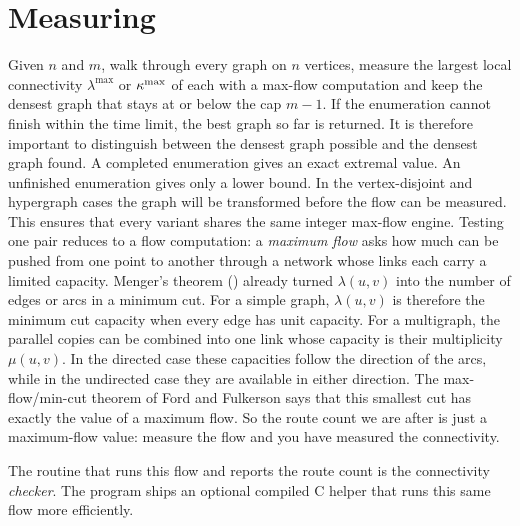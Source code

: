 \section{Measuring}
Given $n$ and $m$, walk through every graph on $n$ vertices, measure the largest
local connectivity $\lambda^{\max}$ or $\kappa^{\max}$ of each with a max-flow computation and
keep the densest graph that stays at or below the cap $m - 1$.
If the enumeration cannot finish within the time limit, the best graph so far is returned.
It is therefore important to distinguish between the densest graph possible and the densest graph found.
A completed enumeration gives an exact extremal value. An unfinished enumeration gives only a lower bound.
In the vertex-disjoint and hypergraph cases the graph will be transformed before the flow can be measured.
This ensures that every variant shares the same integer max-flow engine.
Testing one pair reduces to a flow computation:
a \emph{maximum flow} asks how much can be pushed from one point to another through a network whose links each carry a limited capacity.
Menger's theorem () already turned $\lambda(u,v)$ into the number of edges or arcs in a minimum cut.
For a simple graph, $\lambda(u,v)$ is therefore the minimum cut capacity when every edge has unit capacity.
For a multigraph, the parallel copies can be combined into one link whose capacity is their multiplicity $\mu(u,v)$.
In the directed case these capacities follow the direction of the arcs, while in the undirected case they are available in either direction.
The max-flow/min-cut theorem of Ford and Fulkerson \cite{FordFulkerson56} says that this smallest cut has exactly the value of a maximum flow.
So the route count we are after is just a maximum-flow value: measure the flow and you have measured the connectivity.

The routine that runs this flow and reports the route count is the connectivity \emph{checker}.
The program ships an optional compiled C helper that runs this same flow more efficiently.


